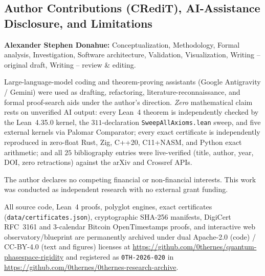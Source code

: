 \documentclass[11pt,reqno]{amsart}
\theoremstyle{definition}
\newcommand{\lid}[1]{{\footnotesize\nolinkurl{#1}}}
\begin{document}
\subsection{Author Contributions (CRediT), AI-Assistance Disclosure, and Limitations}
\begin{description}[leftmargin=1.5em]
  \item[CRediT Authorship Contribution Statement]
    \textbf{Alexander Stephen Donahue:} Conceptualization, Methodology, Formal analysis,
    Investigation, Software architecture, Validation, Visualization, Writing -- original
    draft, Writing -- review \& editing.
  \item[AI-Assistance Transparency Disclosure]
    Large-language-model coding and theorem-proving assistants (Google Antigravity /
    Gemini) were used as drafting, refactoring, literature-reconnaissance, and formal
    proof-search aids under the author's direction. \emph{Zero} mathematical claim rests
    on unverified AI output: every Lean~4 theorem is independently checked by the
    Lean~4.35.0 kernel, the $311$-declaration \lid{SweepAllAxioms.lean} sweep, and five
    external kernels via Palomar Comparator; every exact certificate is independently
    reproduced in zero-float Rust, Zig, C++20, C11+NASM, and Python exact arithmetic; and
    all $25$ bibliography entries were live-verified (title, author, year, DOI, zero
    retractions) against the arXiv and Crossref APIs.
  \item[Conflict of Interest \& Funding]
    The author declares no competing financial or non-financial interests. This work was
    conducted as independent research with no external grant funding.
  \item[Code, Data, and Reproducibility Availability]
    All source code, Lean~4 proofs, polyglot engines, exact certificates
    (\lid{data/certificates.json}), cryptographic SHA-256 manifests, DigiCert RFC~3161
    and 3-calendar Bitcoin OpenTimestamps proofs, and interactive web observatory/blueprint
    are permanently archived under dual Apache-2.0 (code) / CC-BY-4.0 (text and figures)
    licenses at \url{https://github.com/0thernes/quantum-phasespace-rigidity} and
    registered as \lid{0TH-2026-020} in
    \url{https://github.com/0thernes/0thernes-research-archive}.
\end{description}



\end{document}
